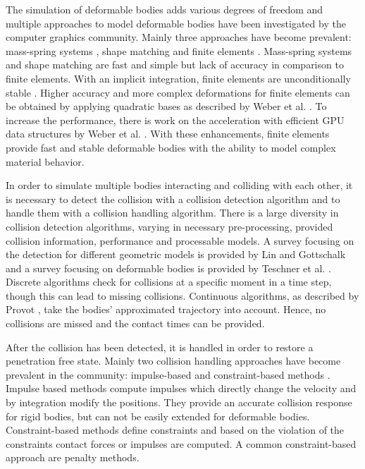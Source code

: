 The simulation of deformable bodies adds various degrees of freedom and multiple approaches to model deformable bodies have been investigated by the computer graphics community. Mainly three approaches have become prevalent: mass-spring systems \cite{LIU2013}, shape matching \cite{MUELLER2005} and finite elements \cite{MUELLER2004}.
Mass-spring systems and shape matching are fast and simple but lack of accuracy in comparison to finite elements.
With an implicit integration, finite elements are unconditionally stable \cite{WEBER2011}. Higher accuracy and more complex deformations for finite elements can be obtained by applying quadratic bases as described by Weber et al. \cite{WEBER2011}.
To increase the performance, there is work on the acceleration with efficient GPU data structures by Weber et al. \cite{WEBER2013}.
With these enhancements, finite elements provide fast and stable deformable bodies with the ability to model complex material behavior.

In order to simulate multiple bodies interacting and colliding with each other, it is necessary to detect the collision with a collision detection algorithm and to handle them with a collision handling algorithm.
There is a large diversity in collision detection algorithms, varying in necessary pre-processing, provided collision information, performance and processable models. A survey focusing on the detection for different geometric models is provided by Lin and Gottschalk \cite{LIN1998} and a survey focusing on deformable bodies is provided by Teschner et al. \cite{TESCHNER2005}.
Discrete algorithms check for collisions at a specific moment in a time step, though this can lead to missing collisions.
Continuous algorithms, as described by Provot \cite{PROVOT1997}, take the bodies' approximated trajectory into account. Hence, no collisions are missed and the contact times can be provided.


After the collision has been detected, it is handled in order to restore a penetration free state.
Mainly two collision handling approaches have become prevalent in the community: impulse-based \cite{BENDER2007} and constraint-based methods \cite{MOORE1988}.
Impulse based methods compute impulses which directly change the velocity and by integration modify the positions. They provide an accurate collision response for rigid bodies, but can not be easily extended for deformable bodies. 
Constraint-based methods define constraints and based on the violation of the constraints contact forces or impulses are computed. A common constraint-based approach are penalty methods.


